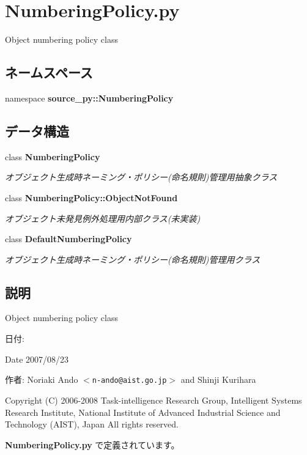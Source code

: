 \section{NumberingPolicy.py}
\label{_numbering_policy_8py}
Object numbering policy class 

\subsection*{ネームスペース}
\begin{CompactItemize}
\item 
namespace \textbf{source\_\-py::NumberingPolicy}
\end{CompactItemize}
\subsection*{データ構造}
\begin{CompactItemize}
\item 
class {\bf NumberingPolicy}
\begin{CompactList}\small\item\em オブジェクト生成時ネーミング・ポリシー(命名規則)管理用抽象クラス \item\end{CompactList}\item 
class {\bf NumberingPolicy::ObjectNotFound}
\begin{CompactList}\small\item\em オブジェクト未発見例外処理用内部クラス(未実装) \item\end{CompactList}\item 
class {\bf DefaultNumberingPolicy}
\begin{CompactList}\small\item\em オブジェクト生成時ネーミング・ポリシー(命名規則)管理用クラス \item\end{CompactList}\end{CompactItemize}


\subsection{説明}
Object numbering policy class 

\begin{Desc}
\item[日付:]\end{Desc}
\begin{Desc}
\item[Date]2007/08/23\end{Desc}
\begin{Desc}
\item[作者:]Noriaki Ando $<${\tt n-ando@aist.go.jp}$>$ and Shinji Kurihara\end{Desc}
Copyright (C) 2006-2008 Task-intelligence Research Group, Intelligent Systems Research Institute, National Institute of Advanced Industrial Science and Technology (AIST), Japan All rights reserved. 

 {\bf NumberingPolicy.py} で定義されています。